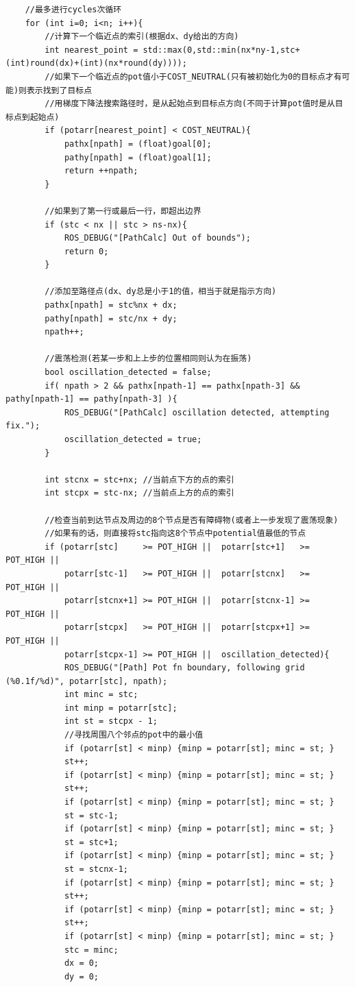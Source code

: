 \documentclass[9pt, oneside]{book}
\begin{document}
\footnotesize
\begin{verbatim}
    //最多进行cycles次循环
    for (int i=0; i<n; i++){
        //计算下一个临近点的索引(根据dx、dy给出的方向)
        int nearest_point = std::max(0,std::min(nx*ny-1,stc+(int)round(dx)+(int)(nx*round(dy))));
        //如果下一个临近点的pot值小于COST_NEUTRAL(只有被初始化为0的目标点才有可能)则表示找到了目标点
        //用梯度下降法搜索路径时，是从起始点到目标点方向(不同于计算pot值时是从目标点到起始点)
        if (potarr[nearest_point] < COST_NEUTRAL){
            pathx[npath] = (float)goal[0];
            pathy[npath] = (float)goal[1];
            return ++npath;
        }

        //如果到了第一行或最后一行，即超出边界
        if (stc < nx || stc > ns-nx){
            ROS_DEBUG("[PathCalc] Out of bounds");
            return 0;
        }

        //添加至路径点(dx、dy总是小于1的值，相当于就是指示方向)
        pathx[npath] = stc%nx + dx;
        pathy[npath] = stc/nx + dy;
        npath++;

        //震荡检测(若某一步和上上步的位置相同则认为在振荡)
        bool oscillation_detected = false;
        if( npath > 2 && pathx[npath-1] == pathx[npath-3] && pathy[npath-1] == pathy[npath-3] ){
            ROS_DEBUG("[PathCalc] oscillation detected, attempting fix.");
            oscillation_detected = true;
        }

        int stcnx = stc+nx; //当前点下方的点的索引
        int stcpx = stc-nx; //当前点上方的点的索引

        //检查当前到达节点及周边的8个节点是否有障碍物(或者上一步发现了震荡现象)
        //如果有的话，则直接将stc指向这8个节点中potential值最低的节点
        if (potarr[stc]     >= POT_HIGH ||  potarr[stc+1]   >= POT_HIGH ||
            potarr[stc-1]   >= POT_HIGH ||  potarr[stcnx]   >= POT_HIGH ||
            potarr[stcnx+1] >= POT_HIGH ||  potarr[stcnx-1] >= POT_HIGH ||
            potarr[stcpx]   >= POT_HIGH ||  potarr[stcpx+1] >= POT_HIGH ||
            potarr[stcpx-1] >= POT_HIGH ||  oscillation_detected){
            ROS_DEBUG("[Path] Pot fn boundary, following grid (%0.1f/%d)", potarr[stc], npath);
            int minc = stc;
            int minp = potarr[stc];
            int st = stcpx - 1;
            //寻找周围八个邻点的pot中的最小值
            if (potarr[st] < minp) {minp = potarr[st]; minc = st; }
            st++;
            if (potarr[st] < minp) {minp = potarr[st]; minc = st; }
            st++;
            if (potarr[st] < minp) {minp = potarr[st]; minc = st; }
            st = stc-1;
            if (potarr[st] < minp) {minp = potarr[st]; minc = st; }
            st = stc+1;
            if (potarr[st] < minp) {minp = potarr[st]; minc = st; }
            st = stcnx-1;
            if (potarr[st] < minp) {minp = potarr[st]; minc = st; }
            st++;
            if (potarr[st] < minp) {minp = potarr[st]; minc = st; }
            st++;
            if (potarr[st] < minp) {minp = potarr[st]; minc = st; }
            stc = minc;
            dx = 0;
            dy = 0;


\end{verbatim}
\end{document}
